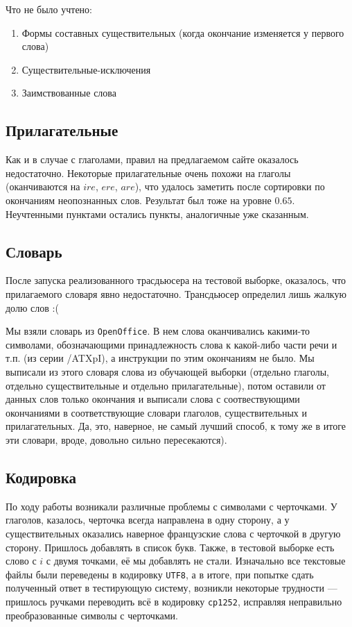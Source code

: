 \documentclass[12pt,a4paper]{article}
\begin{document}
Что не было учтено:
\begin{enumerate}
\item Формы составных существительных (когда окончание изменяется у первого слова)
\item Существительные-исключения
\item Заимствованные слова
\end{enumerate}

\subsection{Прилагательные}
\indent\indent
Как и в случае с глаголами, правил на предлагаемом сайте оказалось недостаточно. Некоторые прилагательные очень похожи на глаголы (оканчиваются на $ire$, $ere$, $are$), что удалось заметить после сортировки по окончаниям неопознанных слов. Результат был тоже на уровне $0.65$. Неучтенными пунктами остались пункты, аналогичные уже сказанным.

\subsection{Словарь}
\indent\indent
После запуска реализованного трасдьюсера на тестовой выборке, оказалось, что прилагаемого словаря явно недостаточно. Трансдьюсер определил лишь жалкую долю слов :( 

Мы взяли словарь из \texttt{OpenOffice}. В нем слова оканчивались какими-то символами, обозначающими принадлежность слова к какой-либо части речи и т.п. (из серии /ATXpI), а инструкции по этим окончаниям не было. Мы выписали из этого словаря слова из обучающей выборки (отдельно глаголы, отдельно существительные и отдельно прилагательные), потом оставили от данных слов только окончания и выписали слова с соотвествующими окончаниями в соответствующие словари глаголов, существительных и прилагательных. Да, это, наверное, не самый лучший способ, к тому же в итоге эти словари, вроде, довольно сильно пересекаются).

\subsection{Кодировка}
\indent\indent
По ходу работы возникали различные проблемы с символами с черточками. У глаголов, казалось, черточка всегда направлена в одну сторону, а у существительных оказались наверное французские слова с черточкой в другую сторону. Пришлось добавлять в список букв. Также, в тестовой выборке есть слово с $i$ с двумя точками, её мы добавлять не стали. Изначально все текстовые файлы были переведены в кодировку \texttt{UTF8}, а в итоге, при попытке сдать полученный ответ в тестирующую систему, возникли некоторые трудности --- пришлось ручками переводить всё в кодировку \texttt{cp1252}, исправляя неправильно преобразованные символы с черточками.
\end{document}
